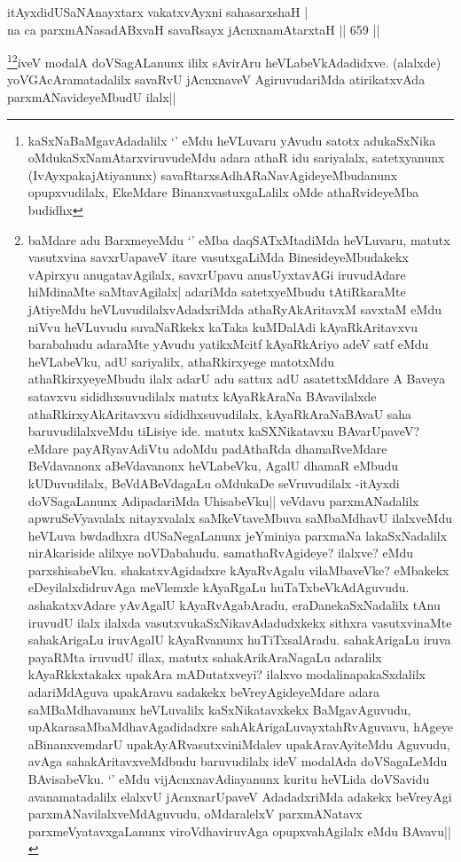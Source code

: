 \begin{shl}
itAyxdidUSaNAnayxtarx vakatxvAyxni sahasarxshaH | \\
na ca parxmANasadABxvaH savaRsayx jAcnxnamAtarxtaH \hfill||  659 ||  
\end{shl}

\begin{artha}
\footnote{kaSxNaBaMgavAdadalilx `\stext' eMdu heVLuvaru yAvudu satotx adukaSxNika oMdukaSxNamAtarxviruvudeMdu adara athaR idu sariyalalx, satetxyanunx (IvAyxpakajAtiyanunx) savaRtarxsAdhARaNavAgideyeMbudanunx opupxvudilalx, EkeMdare BinanxvastuxgaLalilx oMde athaRvideyeMba budidhx}\footnote{baMdare adu BarxmeyeMdu `\stext' eMba daqSATxMtadiMda heVLuvaru, matutx vasutxvina savxrUapaveV itare vasutxgaLiMda BinesideyeMbudakekx vApirxyu anugatavAgilalx, savxrUpavu anusUyxtavAGi iruvudAdare hiMdinaMte saMtavAgilalx| adariMda satetxyeMbudu tAtiRkaraMte jAtiyeMdu heVLuvudilalxvAdadxriMda athaRyAkAritavxM savxtaM eMdu niVvu heVLuvudu suvaNaRkekx kaTaka kuMDalAdi kAyaRkAritavxvu barabahudu adaraMte yAvudu yatikxMcitf kAyaRkAriyo adeV satf eMdu heVLabeVku, adU sariyalilx, athaRkirxyege matotxMdu athaRkirxyeyeMbudu ilalx adarU adu sattux adU asatettxMddare A Baveya satavxvu sididhxsuvudilalx matutx kAyaRkAraNa BAvavilalxde athaRkirxyAkAritavxvu sididhxsuvudilalx, kAyaRkAraNaBAvaU saha baruvudilalxveMdu tiLisiye ide. matutx kaSXNikatavxu BAvarUpaveV? eMdare payARyavAdiVtu adoMdu padAthaRda dhamaRveMdare BeVdavanonx aBeVdavanonx heVLabeVku, AgalU dhamaR eMbudu kUDuvudilalx, BeVdABeVdagaLu oMdukaDe seVruvudilalx -itAyxdi doVSagaLanunx AdipadariMda UhisabeVku|| veVdavu parxmANadalilx apwruSeVyavalalx nitayxvalalx saMkeVtaveMbuva saMbaMdhavU ilalxveMdu heVLuva bwdadhxra dUSaNegaLanunx jeYminiya parxmaNa lakaSxNadalilx nirAkariside alilxye noVDabahudu. samathaRvAgideye? ilalxve? eMdu parxshisabeVku. shakatxvAgidadxre kAyaRvAgalu vilaMbaveVke? eMbakekx eDeyilalxdidruvAga meVlemxle kAyaRgaLu huTaTxbeVkAdAguvudu. ashakatxvAdare yAvAgalU kAyaRvAgabAradu, eraDanekaSxNadalilx tAnu iruvudU ilalx ilalxda vasutxvukaSxNikavAdadudxkekx sithxra vasutxvinaMte sahakArigaLu iruvAgalU kAyaRvanunx huTiTxsalAradu. sahakArigaLu iruva payaRMta iruvudU illax, matutx sahakArikAraNagaLu adaralilx kAyaRkkxtakakx upakAra mADutatxveyi? ilalxvo modalinapakaSxdalilx adariMdAguva upakAravu sadakekx beVreyAgideyeMdare adara saMBaMdhavanunx heVLuvalilx kaSxNikatavxkekx BaMgavAguvudu, upAkarasaMbaMdhavAgadidadxre sahAkArigaLuvayxtahRvAguvavu, hAgeye aBinanxvemdarU upakAyARvasutxviniMdalev upakAravAyiteMdu Aguvudu, avAga sahakAritavxveMdbudu baruvudilalx ideV modalAda doVSagaLeMdu BAvisabeVku. `\stext' eMdu vijAcnxnavAdiayanunx kuritu heVLida doVSavidu avanamatadalilx elalxvU jAcnxnarUpaveV AdadadxriMda adakekx beVreyAgi parxmANavilalxveMdAguvudu, oMdaralelxV parxmANatavx parxmeVyatavxgaLanunx viroVdhaviruvAga opupxvahAgilalx eMdu BAvavu||}iveV modalA doVSagALanunx ililx sAvirAru heVLabeVkAdadidxve. (alalxde) yoVGAcAramatadalilx savaRvU jAcnxnaveV AgiruvudariMda atirikatxvAda parxmANavideyeMbudU ilalx||
\end{artha}

